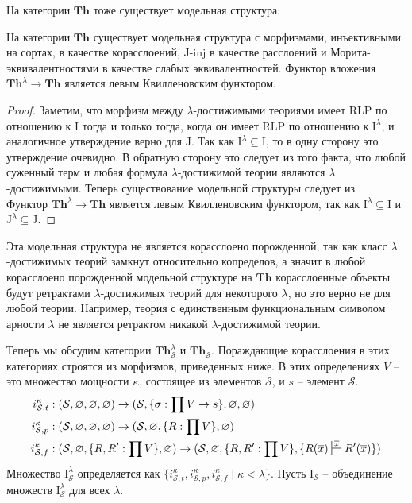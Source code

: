 \documentclass[reqno]{amsart}
\theoremstyle{definition}
\theoremstyle{remark}
\newcommand{\bcat}[1]{\mathbf{#1}}
\newcommand{\Th}{\bcat{Th}}
\newcommand{\I}{\mathrm{I}}
\newcommand{\J}{\mathrm{J}}
\newcommand{\class}[2]{#1\text{-}\mathrm{#2}}
\newcommand{\Iinj}[1][\I]{\class{#1}{inj}}
\newcommand{\Jinj}[1][]{\Iinj[\J#1]}
\begin{document}
На категории $\Th$ тоже существует модельная структура:

\begin{prop}
На категории $\Th$ существует модельная структура с морфизмами, инъективными на сортах, в качестве корасслоений, $\Jinj$ в качестве расслоений и Морита-эквивалентностями в качестве слабых эквивалентностей.
Функтор вложения $\Th^\lambda \to \Th$ является левым Квилленовским функтором.
\end{prop}
\begin{proof}
Заметим, что морфизм между $\lambda$-достижимыми теориями имеет RLP по отношению к $\I$ тогда и только тогда, когда он имеет RLP по отношению к $\I^\lambda$, и аналогичное утверждение верно для $\J$.
Так как $\I^\lambda \subseteq \I$, то в одну сторону это утверждение очевидно.
В обратную сторону это следует из того факта, что любой суженный терм и любая формула $\lambda$-достижимой теории являются $\lambda$-достижимыми.
Теперь существование модельной структуры следует из .
Функтор $\Th^\lambda \to \Th$ является левым Квилленовским функтором, так как $\I^\lambda \subseteq \I$ и $\J^\lambda \subseteq \J$.
\end{proof}

\begin{remark}
Эта модельная структура не является корасслоено порожденной, так как класс $\lambda$-достижимых теорий замкнут относительно копределов,
а значит в любой корасслоено порожденной модельной структуре на $\Th$ корасслоенные объекты будут ретрактами $\lambda$-достижимых теорий для некоторого $\lambda$, но это верно не для любой теории.
Например, теория с единственным функциональным символом арности $\lambda$ не является ретрактом никакой $\lambda$-достижимой теории.
\end{remark}

Теперь мы обсудим категории $\Th^\lambda_\mathcal{S}$ и $\Th_\mathcal{S}$.
Пораждающие корасслоения в этих категориях строятся из морфизмов, приведенных ниже.
В этих определениях $V$ -- это множество мощности $\kappa$, состоящее из элементов $\mathcal{S}$, и $s$ -- элемент $\mathcal{S}$.
\begin{align*}
i_{\mathcal{S},t}^\kappa & : (\mathcal{S}, \varnothing, \varnothing, \varnothing) \to (\mathcal{S}, \{ \sigma : \prod V \to s \}, \varnothing, \varnothing) \\
i_{\mathcal{S},p}^\kappa & : (\mathcal{S}, \varnothing, \varnothing, \varnothing) \to (\mathcal{S}, \varnothing, \{ R : \prod V \}, \varnothing) \\
i_{\mathcal{S},f}^\kappa & : (\mathcal{S}, \varnothing, \{ R, R' : \prod V \}, \varnothing) \to (\mathcal{S}, \varnothing, \{ R, R' : \prod V \}, \{ R(\overline{x}) \sststile{}{\overline{x}} R'(\overline{x}) \})
\end{align*}
Множество $\I_\mathcal{S}^\lambda$ определяется как $\{ i_{\mathcal{S},t}^\kappa, i_{\mathcal{S},p}^\kappa, i_{\mathcal{S},f}^\kappa \mid \kappa < \lambda \}$.
Пусть $\I_\mathcal{S}$ -- объединение множеств $\I_\mathcal{S}^\lambda$ для всех $\lambda$.
\end{document}
